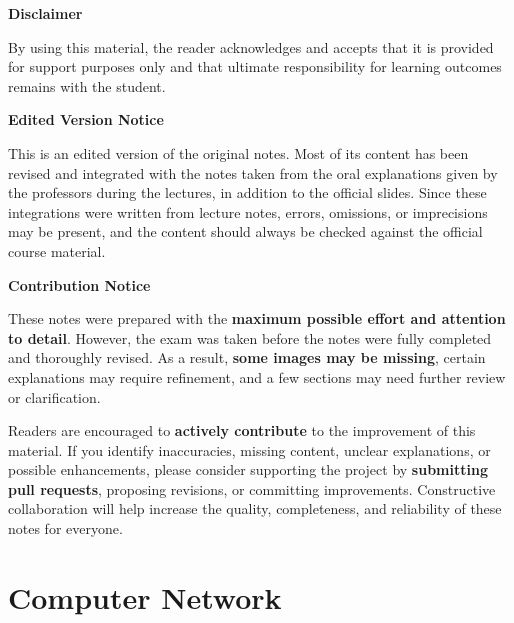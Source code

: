 \documentclass[11pt,a4paper,openany]{report}
\begin{document}
\begin{notebox}
\textbf{Disclaimer}\par
By using this material, the reader acknowledges and accepts that it is provided for support purposes only and that ultimate responsibility for learning outcomes remains with the student.
\end{notebox}

\begin{notebox}
	\textbf{Edited Version Notice}\par
	This is an edited version of the original notes. Most of its content has been revised and integrated with the notes taken from the oral explanations given by the professors during the lectures, in addition to the official slides. Since these integrations were written from lecture notes, errors, omissions, or imprecisions may be present, and the content should always be checked against the official course material.
\end{notebox}

\begin{notebox}
\textbf{Contribution Notice}\par
These notes were prepared with the \textbf{maximum possible effort and attention to detail}. However, the exam was taken before the notes were fully completed and thoroughly revised. As a result, \textbf{some images may be missing}, certain explanations may require refinement, and a few sections may need further review or clarification.
\end{notebox}

\begin{notebox}
Readers are encouraged to \textbf{actively contribute} to the improvement of this material. If you identify inaccuracies, missing content, unclear explanations, or possible enhancements, please consider supporting the project by \textbf{submitting pull requests}, proposing revisions, or committing improvements. Constructive collaboration will help increase the quality, completeness, and reliability of these notes for everyone.
\end{notebox}
\clearpage
{}
\hypersetup{pageanchor=true}

\setcounter{tocdepth}{2}%
\tableofcontents
\clearpage




\part{Computer Network}
\end{document}
